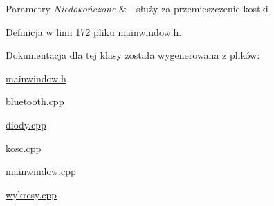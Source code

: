 \begin{DoxyParams}{Parametry}
{\em Niedokończone} & -\/ służy za przemieszczenie kostki \\
\hline
\end{DoxyParams}


Definicja w linii 172 pliku mainwindow.\+h.



Dokumentacja dla tej klasy została wygenerowana z plików\+:\begin{DoxyCompactItemize}
\item 
\hyperlink{mainwindow_8h}{mainwindow.\+h}\item 
\hyperlink{bluetooth_8cpp}{bluetooth.\+cpp}\item 
\hyperlink{diody_8cpp}{diody.\+cpp}\item 
\hyperlink{kosc_8cpp}{kosc.\+cpp}\item 
\hyperlink{mainwindow_8cpp}{mainwindow.\+cpp}\item 
\hyperlink{wykresy_8cpp}{wykresy.\+cpp}\end{DoxyCompactItemize}
